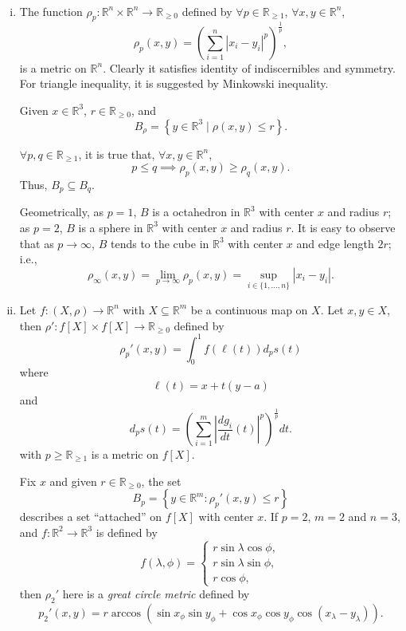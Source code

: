 \begin{example} \ 
	\begin{enumerate}[(i)]
		\item The function $\rho_p: \mathbb R^n \times \mathbb R^n \to \mathbb R_{\ge 0}$ defined by $\forall p \in \mathbb R_{\ge 1}$, $\forall x,y \in \mathbb R^n$,
			$$
			\rho_p (x,y) = \left( \sum_{i = 1}^n |x_i - y_i|^p \right)^\frac{1}{p},
			$$
			is a metric on $\mathbb R^n$. Clearly it satisfies identity of indiscernibles and symmetry. For triangle inequality, it is suggested by Minkowski inequality.
			
			Given $x \in \mathbb R^3$, $r \in \mathbb R_{\ge 0}$, and
			$$
			B_\rho = \left\{ y \in \mathbb R^3 \;|\; \rho (x,y) \le r \right\}.
			$$
			
			
			$\forall p, q \in \mathbb R_{\ge 1}$, it is true that, $\forall x,y \in \mathbb R^n$,
			$$
			p \le q \implies \rho_p(x,y) \ge \rho_{q}(x,y).
			$$
			Thus, $B_p \subseteq B_q$.
			
			Geometrically, as $p = 1$, $B$ is a octahedron in $\mathbb R^3$ with center $x$ and radius $r$; as $p = 2$, $B$ is a sphere in $\mathbb R^3$ with center $x$ and radius $r$. It is easy to observe that as $p \to \infty$, $B$ tends to the cube in $\mathbb R^3$ with center $x$ and edge length $2r$; i.e.,
			$$
			\rho_\infty(x,y) = \lim_{p \to \infty} \rho_p (x,y) = \sup_{i \in \{1, \ldots, n\}} |x_i - y_i|.
			$$
		
		
		\item Let $f: (X, \rho) \to \mathbb R^n$ with $X \subseteq \mathbb R^m$ be a continuous map on $X$. Let $x, y \in X$, then $\rho': f[X] \times f[X] \to \mathbb R_{\ge 0}$ defined by
			$$
			\rho_p'(x,y) = \int_0^1 f(\ell(t))d_ps(t)
			$$
			where
			$$
			\ell (t) = x + t(y - a)
			$$
			and
			$$
			d_p s(t) = \left( \sum_{i = 1}^m \left|\frac{dg_i}{dt}(t)\right|^p\right)^\frac{1}{p} dt.
			$$
			with $p \ge \mathbb R_{\ge 1}$ is a metric on $f[X]$.
			
			Fix $x$ and given $r \in \mathbb R_{\ge 0}$, the set
			$$
			B_p = \left\{ y \in \mathbb R^m : \rho_p'(x,y) \le r \right\}
			$$
			describes a set ``attached'' on $f[X]$ with center $x$.			
			If $p = 2$, $m = 2$ and $n = 3$, and $f: \mathbb R^2 \to \mathbb R^3$ is defined by
			$$
			f(\lambda, \phi) = \begin{cases}
				r \sin \lambda \cos \phi, \\
				r \sin \lambda \sin \phi, \\
				r \cos \phi,
			\end{cases}
			$$
			then $\rho_2'$ here is a \textit{great circle metric} defined by
			$$
			p_2'(x,y) = r\arccos(\sin x_\phi \sin y_\phi + \cos x_\phi \cos y_\phi \cos(x_\lambda - y_\lambda)).
			$$
		

\end{enumerate}
\end{example}
